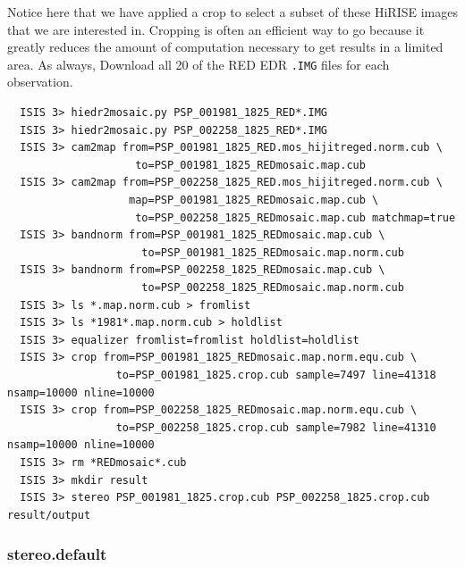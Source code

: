 Notice here that we have applied a crop to select a subset of these
HiRISE images that we are interested in.  Cropping is often an
efficient way to go because it greatly reduces the amount of
computation necessary to get results in a limited area.  As always,
Download all 20 of the RED EDR \texttt{.IMG} files for each observation.
\begin{verbatim}
  ISIS 3> hiedr2mosaic.py PSP_001981_1825_RED*.IMG
  ISIS 3> hiedr2mosaic.py PSP_002258_1825_RED*.IMG
  ISIS 3> cam2map from=PSP_001981_1825_RED.mos_hijitreged.norm.cub \
                    to=PSP_001981_1825_REDmosaic.map.cub
  ISIS 3> cam2map from=PSP_002258_1825_RED.mos_hijitreged.norm.cub \
                   map=PSP_001981_1825_REDmosaic.map.cub \
                    to=PSP_002258_1825_REDmosaic.map.cub matchmap=true
  ISIS 3> bandnorm from=PSP_001981_1825_REDmosaic.map.cub \
                     to=PSP_001981_1825_REDmosaic.map.norm.cub
  ISIS 3> bandnorm from=PSP_002258_1825_REDmosaic.map.cub \
                     to=PSP_002258_1825_REDmosaic.map.norm.cub
  ISIS 3> ls *.map.norm.cub > fromlist
  ISIS 3> ls *1981*.map.norm.cub > holdlist
  ISIS 3> equalizer fromlist=fromlist holdlist=holdlist
  ISIS 3> crop from=PSP_001981_1825_REDmosaic.map.norm.equ.cub \
                 to=PSP_001981_1825.crop.cub sample=7497 line=41318 nsamp=10000 nline=10000
  ISIS 3> crop from=PSP_002258_1825_REDmosaic.map.norm.equ.cub \
                 to=PSP_002258_1825.crop.cub sample=7982 line=41310 nsamp=10000 nline=10000
  ISIS 3> rm *REDmosaic*.cub
  ISIS 3> mkdir result
  ISIS 3> stereo PSP_001981_1825.crop.cub PSP_002258_1825.crop.cub result/output
\end{verbatim}

\subsubsection*{stereo.default}


